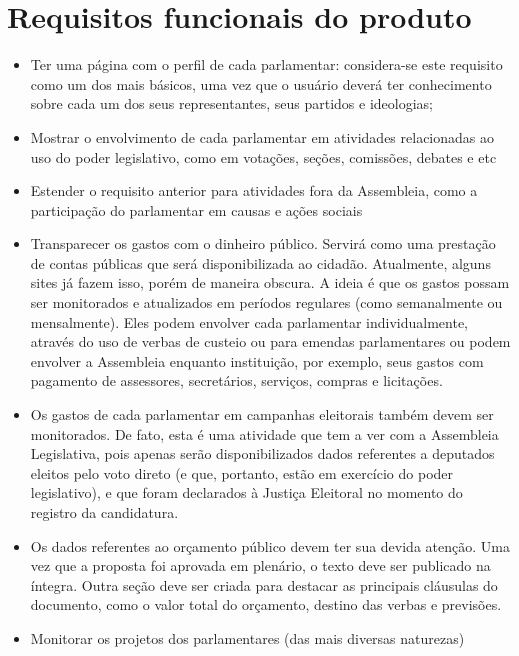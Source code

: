\documentclass[12pt, a4paper]{article}
\begin{document}
    \section{Requisitos funcionais do produto}
    \begin{itemize}
    \item Ter uma página com o perfil de cada parlamentar: considera-se este
        requisito como um dos mais básicos, uma vez que o usuário deverá ter
        conhecimento sobre cada um dos seus representantes, seus partidos e
        ideologias;
    \item Mostrar o envolvimento de cada parlamentar em atividades relacionadas
        ao uso do poder legislativo, como em votações, seções, comissões,
        debates e etc
    \item Estender o requisito anterior para atividades fora da Assembleia,
        como a participação do parlamentar em causas e ações sociais
    \item Transparecer os gastos com o dinheiro público. Servirá como uma
        prestação de contas públicas que será disponibilizada ao cidadão.
        Atualmente, alguns sites já fazem isso, porém de maneira obscura. A
        ideia é que os gastos possam ser monitorados e atualizados em períodos
        regulares (como semanalmente ou mensalmente). Eles podem envolver cada
        parlamentar individualmente, através do uso de verbas de custeio ou
        para emendas parlamentares ou podem envolver a Assembleia enquanto
        instituição, por exemplo, seus gastos com pagamento de assessores,
        secretários, serviços, compras e licitações.
    \item Os gastos de cada parlamentar em campanhas eleitorais também devem
        ser monitorados. De fato, esta é uma atividade que tem a ver com a
        Assembleia Legislativa, pois apenas serão disponibilizados dados
        referentes a deputados eleitos pelo voto direto (e que, portanto, estão
        em exercício do poder legislativo), e que foram declarados à Justiça
        Eleitoral no momento do registro da candidatura.
    \item Os dados referentes ao orçamento público devem ter sua devida
        atenção. Uma vez que a proposta foi aprovada em plenário, o texto deve
        ser publicado na íntegra. Outra seção deve ser criada para destacar as
        principais cláusulas do documento, como o valor total do orçamento,
        destino das verbas e previsões.
    \item Monitorar os projetos dos parlamentares (das mais diversas naturezas)

\end{itemize}
\end{document}
